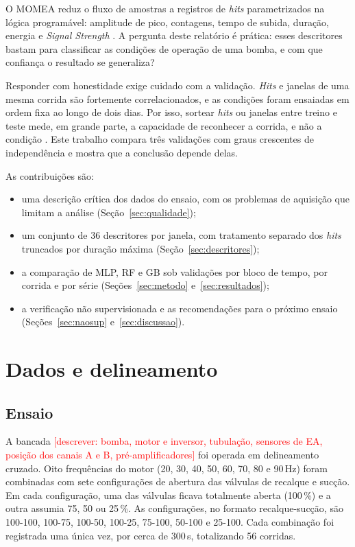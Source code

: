 \documentclass[12pt]{article}
\newcommand{\completar}[1]{\textcolor{red}{[#1]}}
\begin{document}
O MOMEA reduz o fluxo de amostras a registros de \textit{hits} parametrizados na lógica programável: amplitude de pico, contagens, tempo de subida, duração, energia e \textit{Signal Strength} \cite{unnthorsson2013,vallen2022}. A pergunta deste relatório é prática: esses descritores bastam para classificar as condições de operação de uma bomba, e com que confiança o resultado se generaliza?

Responder com honestidade exige cuidado com a validação. \textit{Hits} e janelas de uma mesma corrida são fortemente correlacionados, e as condições foram ensaiadas em ordem fixa ao longo de dois dias. Por isso, sortear \textit{hits} ou janelas entre treino e teste mede, em grande parte, a capacidade de reconhecer a corrida, e não a condição \cite{kaufman2012,roberts2017}. Este trabalho compara três validações com graus crescentes de independência e mostra que a conclusão depende delas.

As contribuições são:
\begin{itemize}
	\item uma descrição crítica dos dados do ensaio, com os problemas de aquisição que limitam a análise (Seção~\ref{sec:qualidade});
	\item um conjunto de 36 descritores por janela, com tratamento separado dos \textit{hits} truncados por duração máxima (Seção~\ref{sec:descritores});
	\item a comparação de MLP, RF e GB sob validações por bloco de tempo, por corrida e por série (Seções~\ref{sec:metodo} e~\ref{sec:resultados});
	\item a verificação não supervisionada e as recomendações para o próximo ensaio (Seções~\ref{sec:naosup} e~\ref{sec:discussao}).
\end{itemize}

\section{Dados e delineamento}
\label{sec:dados}

\subsection{Ensaio}

A bancada \completar{descrever: bomba, motor e inversor, tubulação, sensores de EA, posição dos canais A e B, pré-amplificadores} foi operada em delineamento cruzado. Oito frequências do motor (20, 30, 40, 50, 60, 70, 80 e 90\,Hz) foram combinadas com sete configurações de abertura das válvulas de recalque e sucção. Em cada configuração, uma das válvulas ficava totalmente aberta (100\,\%) e a outra assumia 75, 50 ou 25\,\%. As configurações, no formato recalque-sucção, são 100-100, 100-75, 100-50, 100-25, 75-100, 50-100 e 25-100. Cada combinação foi registrada uma única vez, por cerca de 300\,s, totalizando 56 corridas.
\end{document}
